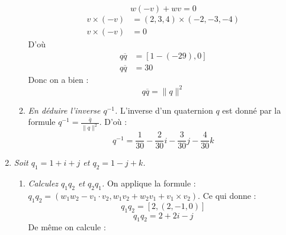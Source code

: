 \documentclass[a4paper,12pt]{article}
\begin{document}
\begin{enumerate}
\begin{enumerate}
              \begin{equation}
              w (-v) + w v = 0
              \end{equation}
              \begin{align}
              v \times (-v) &= (2, 3, 4) \times (-2, -3, -4) \\
              v \times (-v) &= 0
              \end{align}
              D'où              
              \begin{align}
               q \overline{q} &= [1 - (-29), 0 ] \\
               q \overline{q} &= 30
              \end{align}
              Donc on a bien :
              \begin{equation}
              \boxed{q \overline{q} = \lVert q \rVert^2}
              \end{equation}
              \item \emph{En déduire l'inverse \( q^{-1} \).} \newline \newline
              L'inverse d'un quaternion \(q\) est donné par la formule \( q^{-1} = \frac{\overline{q}}{\lVert q \rVert^2} \).
              D'où :
              \begin{equation}
              \boxed{q^{-1}  = \frac{1}{30} - \frac{2}{30} i - \frac{3}{30} j - \frac{4}{30} k }
              \end{equation}
          \end{enumerate}
    \item \emph{Soit \( q_1 = 1 + i + j \) et \( q_2 = 1 - j + k \).}
          \begin{enumerate}
              \item \emph{Calculez \( q_1 q_2 \) et \( q_2 q_1 \).} \newline \newline
              On applique la formule :
              \( q_1 q_2 = (w_1 w_2 − v_1 \cdot v_2, w_1 v_2 + w_2 v_1 + v_1 \times v_2) \). \newline
              Ce qui donne :
              \begin{equation}
              q_1 q_2 = [2, (2, -1, 0)]
              \end{equation}
              \begin{equation}
              \boxed{q_1 q_2 = 2 + 2 i - j}
              \end{equation}
              De même on calcule :

\end{enumerate}
\end{enumerate}
\end{document}
